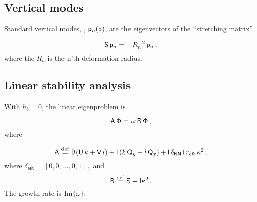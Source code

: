 \documentclass[11pt]{article}
\newcommand{\sS}{\mathsf{S}}
\begin{document}
\subsection*{Vertical modes}
Standard vertical modes, , $\sp_n (z)$, are the eigenvectors of the ``stretching matrix''

\begin{equation}
\sS \,\sp_n = -R_n^{-2}\, \sp_n\,,
\end{equation}
where the $R_n$ is the n'th deformation radius.

\subsection*{Linear stability analysis}

With $h_b = 0$, the linear eigenproblem is

\begin{equation}
 \sA \, \mathsf{\Phi} = \omega \, \sB\, \mathsf{\Phi}\,,
\end{equation}
where

\begin{equation}
\sA \defn \mathsf{B}(\mathsf{U}\, k + \mathsf{V}\,l) + \mathsf{I}\left(k\,\mathsf{Q}_y - l\,\mathsf{Q}_x\right) + \mathsf{I}\,\delta_{\mathsf{N}\mathsf{N}}\, \mathrm{i} \,r_{ek}\,\kappa^2\,,
\end{equation}
where $\delta_{\mathsf{N}\mathsf{N}} = [0,0,\dots,0,1]\,,$
and 
\begin{equation}
\mathsf{B} \defn  \mathsf{S} - \mathsf{I} \kappa^2\,. 
\end{equation}
The growth rate is Im$\{\omega\}$.
\end{document}
